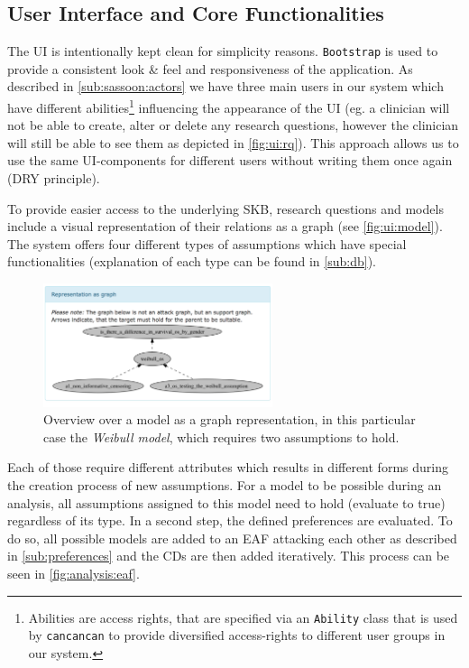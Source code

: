 \subsection{User Interface and Core Functionalities}
\label{sub:ui}

The \gls{UI} is intentionally kept clean for simplicity reasons. \texttt{Bootstrap} is used to provide a consistent look \& feel and responsiveness of the application. As described in \autoref{sub:sassoon:actors} we have three main users in our system which have different abilities\footnote{Abilities are access rights, that are specified via an \texttt{Ability} class that is used by \texttt{cancancan} to provide diversified access-rights to different user groups in our system.} influencing the appearance of the \gls{UI} (eg. a clinician will not be able to create, alter or delete any research questions, however the clinician will still be able to see them as depicted in \autoref{fig:ui:rq}). This approach allows us to use the same \gls{UI}-components for different users without writing them once again (\gls{DRY} principle).



To provide easier access to the underlying \gls{SKB}, research questions and models include a visual representation of their relations as a graph (see \autoref{fig:ui:model}). The system offers four different types of assumptions which have special functionalities (explanation of each type can be found in \autoref{sub:db}).




\begin{figure}[hbtp]
\centering
\includegraphics[width=0.6\textwidth]{figures/ui_Weibull_Model}
\caption{Overview over a model as a graph representation, in this particular case the \textit{Weibull model}, which requires two assumptions to hold.}
\label{fig:ui:model}
\end{figure}

Each of those require different attributes which results in different forms during the creation process of new assumptions. For a model to be possible during an analysis, all assumptions assigned to this model need to hold (evaluate to true) regardless of its type. In a second step, the defined \glspl{preference} are evaluated. To do so, all possible models are added to an \gls{EAF} attacking each other as described in \autoref{sub:preferences} and the \glspl{CD} are then added iteratively. This process can be seen in \autoref{fig:analysis:eaf}.

